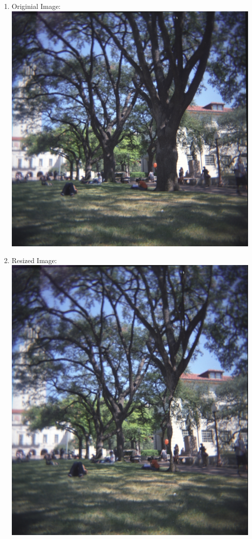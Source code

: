 \documentclass{article}
\begin{document}
\begin{enumerate}
\begin{enumerate}
		\begin{enumerate}
			\item Originial Image: \\ 
			\includegraphics[width=\linewidth]{../matlab/inputSeamCarvingMall.jpg}
			\item Resized Image: \\
			\includegraphics[width=\linewidth]{../matlab/outputReduceWidthMall.png}

\end{enumerate}
\end{enumerate}
\end{enumerate}
\end{document}

